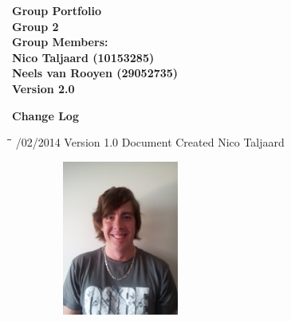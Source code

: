 \documentclass[12pt]{article}
\newcommand{\Title}{Group Portfolio} %
\begin{document}
	\begin{center}%
	
	  \LARGE \bf \Title \\[4em]
	  \LARGE {\bf Group 2}\\[1em]
	  \LARGE {\bf Group Members:}\\[2em]
	  \large
	      Nico Taljaard					(10153285) \\
   	      Neels van Rooyen				(29052735) \\[9em]
	      {\bf Version 2.0}	    
	\end{center}%
	
	\newpage
	{\LARGE \bf Change Log}\\[2em]	
		\begin{tabbing}
			\hspace*{3cm}\=\hspace*{3cm}\=\hspace*{8cm}\=\hspace*{3cm} /02/2014 \> Version 1.0 \> Document Created 		\> Nico Taljaard\\
		\end{tabbing}

	\newpage
	\begin{figure}[ht!]
		\centering
		\includegraphics[width=2in, height=2in]{./Pictures/NicoTaljaard.jpg}
	\end{figure}
	
\end{document}
